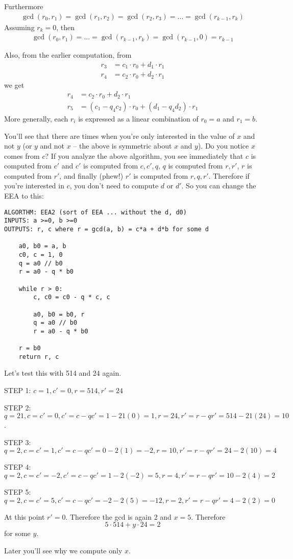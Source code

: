 Furthermore
\begin{align*}
\gcd(r_0, r_1) = \gcd(r_1, r_2) = \gcd(r_2, r_3) = ... = \gcd(r_{k-1}, r_k)
\end{align*}
Assuming $r_k = 0$, then
\begin{align*}
\gcd(r_0, r_1) = ... = \gcd(r_{k-1}, r_k) = \gcd(r_{k-1}, 0) = r_{k - 1}
\end{align*}

Also, from the earlier computation, from
\begin{align*}
r_3 &= c_1 \cdot r_0 + d_1 \cdot r_1  \\
r_4 &= c_2 \cdot r_0 + d_2 \cdot r_1 
\end{align*}
we get
\begin{align*}
r_4 &=c_2 \cdot r_0 + d_2 \cdot r_1 \\
r_5 &= (c_1 - q_4 c_2) \cdot r_0 + (d_1 - q_4 d_2) \cdot r_1 
\end{align*}
More generally, each $r_i$ is expressed as a linear combination of
$r_0 = a$ and $r_1 = b$.




You'll see that there are times when you're only interested in 
the value of $x$ and not $y$ (or $y$ and not $x$ -- the above is symmetric
about $x$ and $y$).
Do you notice $x$ comes from $c$?
If you analyze the above algorithm, you see immediately that $c$
is computed from $c'$ and $c'$ is computed from $c,c',q$, 
$q$ is computed from $r, r'$, $r$ is computed from $r'$,
and finally (phew!) $r'$ is computed from $r, q, r'$.
Therefore if you're interested in $c$, you don't need to compute $d$ 
or $d'$.
So you can change the EEA to this:

\begin{Verbatim}[frame=single, fontsize=\small]
ALGORTHM: EEA2 (sort of EEA ... without the d, d0)
INPUTS: a >=0, b >=0
OUTPUTS: r, c where r = gcd(a, b) = c*a + d*b for some d

    a0, b0 = a, b
    c0, c = 1, 0
    q = a0 // b0
    r = a0 - q * b0

    while r > 0:   
        c, c0 = c0 - q * c, c
    
        a0, b0 = b0, r
        q = a0 // b0
        r = a0 - q * b0

    r = b0
    return r, c
\end{Verbatim}

Let's test this with 514 and 24 again.
\begin{myenum}
\item[] STEP 1: $c=1, c'=0, r=514, r'=24$
\item[] STEP 2: $q=21, c=c'=0, c'=c-qc'=1-21(0)=1, r=24,r'=r-qr'=514-21(24)=10$.
\item[] STEP 3: $q=2, c=c'=1, c'=c-qc'=0-2(1)=-2, r=10, r'=r-qr'=24-2(10)=4$
\item[] STEP 4: $q=2, c=c'=-2, c'=c-qc'=1-2(-2)=5, r=4, r'=r-qr'=10-2(4)=2$
\item[] STEP 5: $q=2, c=c'=5, c'=c-qc'=-2-2(5)=-12, r=2, r'=r-qr'=4-2(2)=0$
\end{myenum}
At this point $r'=0$. Therefore the gcd is again 2 and $x=5$.
Therefore 
\[
5 \cdot 514 + y \cdot 24 = 2
\]
for some $y$.

Later you'll see why we compute only $x$.





